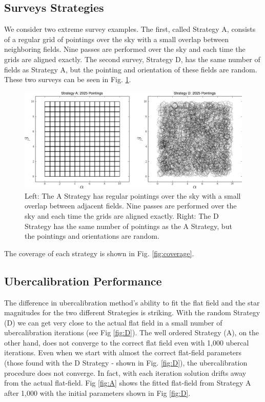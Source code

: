 \documentclass[manuscript]{aastex}
\begin{document}
\subsection{Surveys Strategies}
We consider two extreme survey examples. The first, called Strategy A, consists of a regular grid of pointings over the sky with a small overlap between neighboring fields. Nine passes are performed over the sky and each time the grids are aligned exactly. The second survey, Strategy D, has the same number of fields as Strategy A, but the pointing and orientation of these fields are random. These two surveys can be seen in Fig. \ref{fig:surveys}.


\begin{figure}[ht]
\begin{center}
\includegraphics[width=\textwidth]{surveys.png}
\end{center}
\caption{Left: The A Strategy has regular pointings over the sky with a small overlap between adjacent fields. Nine passes are performed over the sky and each time the grids are aligned exactly. Right: The D Strategy has the same number of pointings as the A Strategy, but the pointings and orientations are random.\label{fig:surveys}}
\end{figure}

The coverage of each strategy is shown in Fig. \ref{fig:coverage}.

\subsection{Ubercalibration Performance}

The difference in ubercalibration method's ability to fit the flat field and the star magnitudes for the two different Strategies is striking. With the random Strategy (D) we can get very close to the actual flat field in a small number of ubercalibration iterations (see Fig \ref{fig:D}). The well ordered Strategy (A), on the other hand, does not converge to the correct flat field even with 1,000 ubercal iterations. Even when we start with almost the correct flat-field parameters (those found with the D Strategy - shown in Fig. \ref{fig:D}), the ubercalibration procedure does not converge. In fact, with each iteration solution drifts away from the actual flat-field. Fig \ref{fig:A} shows the fitted flat-field from Strategy A after 1,000 with the initial parameters shown in Fig \ref{fig:D}.
\end{document}
